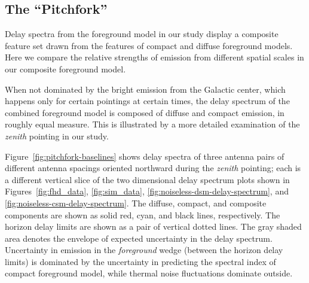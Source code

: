 \documentclass[preprint2,iop,numberedappendix]{emulateapj}
\begin{document}
\subsection{The ``Pitchfork''}\label{sec:composite}

Delay spectra from the foreground model in our study display a composite feature set drawn from the features of compact and diffuse foreground models. Here we compare the relative strengths of emission from different spatial scales in our composite foreground model. 

When not dominated by the bright emission from the Galactic center, which happens only for certain pointings at certain times, the delay spectrum of the combined foreground model is composed of diffuse and compact emission, in roughly equal measure. This is illustrated by a more detailed examination of the {\it zenith} pointing in our study. 

Figure~\ref{fig:pitchfork-baselines} shows delay spectra of three antenna pairs of different antenna spacings oriented northward during the {\it zenith} pointing; each is a different vertical slice of the two dimensional delay spectrum plots shown in Figures~\ref{fig:fhd_data}, \ref{fig:sim_data}, \ref{fig:noiseless-dsm-delay-spectrum}, and \ref{fig:noiseless-csm-delay-spectrum}. The diffuse, compact, and composite components are shown as solid red, cyan, and black lines, respectively. The horizon delay limits are shown as a pair of vertical dotted lines. The gray shaded area denotes the envelope of expected uncertainty in the delay spectrum. Uncertainty in emission in the {\it foreground} wedge (between the horizon delay limits) is dominated by the %
uncertainty in predicting the spectral index of compact foreground model, while thermal noise fluctuations dominate outside. 
\end{document}
